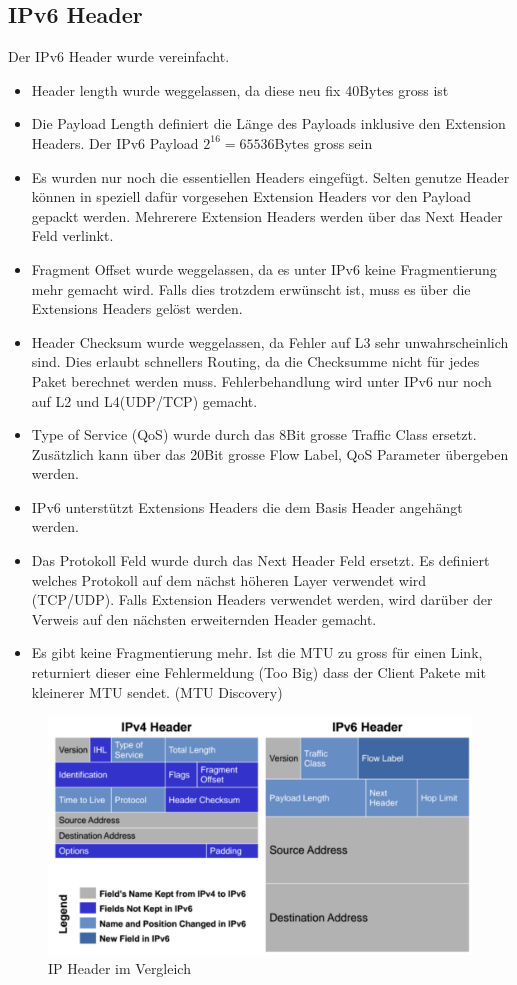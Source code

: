 \subsection{IPv6 Header}
Der IPv6 Header wurde vereinfacht.
\begin{itemize}
	\item Header length wurde weggelassen, da diese neu fix 40Bytes gross ist
	\item Die Payload Length definiert die Länge des Payloads inklusive den Extension Headers. Der IPv6 Payload $2^{16} = 65536$Bytes gross sein
	\item Es wurden nur noch die essentiellen Headers eingefügt. Selten genutze Header können in speziell dafür vorgesehen Extension Headers vor den Payload gepackt werden. Mehrerere Extension Headers werden über das Next Header Feld verlinkt.
	\item Fragment Offset wurde weggelassen, da es unter IPv6 keine Fragmentierung mehr gemacht wird. Falls dies trotzdem erwünscht ist, muss es über die Extensions Headers gelöst werden.
	\item Header Checksum wurde weggelassen, da Fehler auf L3 sehr unwahrscheinlich sind. Dies erlaubt schnellers Routing, da die Checksumme nicht für jedes Paket berechnet werden muss. Fehlerbehandlung wird unter IPv6 nur noch auf L2 und L4(UDP/TCP) gemacht.
	\item Type of Service (QoS) wurde durch das 8Bit grosse Traffic Class ersetzt. Zusätzlich kann über das 20Bit grosse Flow Label, QoS Parameter übergeben werden.
	\item IPv6 unterstützt Extensions Headers die dem Basis Header angehängt werden.
	\item Das Protokoll Feld wurde durch das Next Header Feld ersetzt. Es definiert welches Protokoll auf dem nächst höheren Layer verwendet wird (TCP/UDP). Falls Extension Headers verwendet werden, wird darüber der Verweis auf den nächsten erweiternden Header gemacht.	
	\item Es gibt keine Fragmentierung mehr. Ist die MTU zu gross für einen Link, returniert dieser eine Fehlermeldung (Too Big) dass der Client Pakete mit kleinerer MTU sendet. (MTU Discovery)
\end{itemize}
\begin{figure}[h]
	\centering
	\includegraphics[width=0.5\linewidth]{images/ipv6_headers.pdf}
	\caption{IP Header im Vergleich}
\end{figure}


